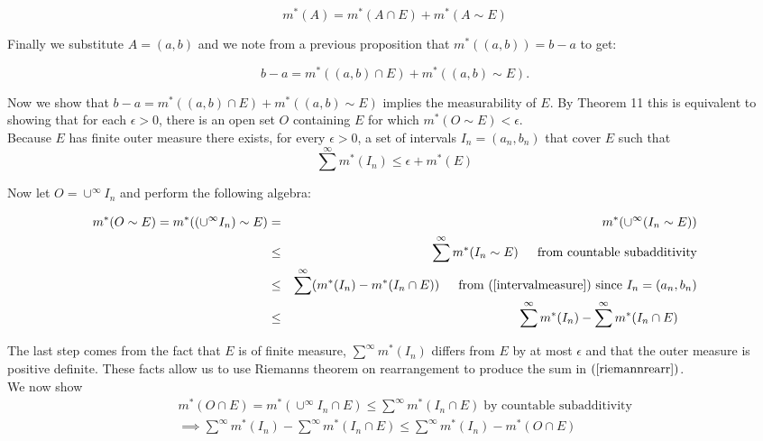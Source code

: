 \documentclass[11pt,reqno]{article}
\begin{document}
\[  m^*(A) = m^*(A \cap E) + m^*(A \sim E) \]

\noindent Finally we substitute $A = (a,b)$ and we note from a previous proposition that $m^*((a,b)) = b - a$ to get:

\begin{equation} 
b - a =  m^*((a,b) \cap E) + m^*((a,b) \sim E). \label{intervalmeasure} 
\end{equation}

Now we show that $b - a =  m^*((a,b) \cap E) + m^*((a,b) \sim E)$ implies the measurability of $E$. By Theorem 11 this is equivalent to showing that for each $\epsilon > 0$,  there is an open set $O$ containing $E$ for which $m^*(O \sim E) < \epsilon$.\\

Because $E$ has finite outer measure there exists, for every $\epsilon > 0$, a set of intervals $I_n = (a_n, b_n)$ that cover $E$ such that 
\begin{equation} 
\sum^\infty m^*(I_n)  \le \epsilon  + m^*(E) \label{finitemeasurebound} 
\end{equation}

Now let $O = \cup^\infty I_n$ and perform the following algebra:

\begin{eqnarray}
m^*(O \sim E) = m^*((\cup^\infty I_n) \sim E) &=& m^*(\cup^\infty (I_n \sim E))  \nonumber \\
&\le& \sum^\infty m^*(I_n \sim E) \hspace{15px} \text{from countable subadditivity} \nonumber \\
&\le& \sum^\infty (m^*(I_n) -  m^*(I_n \cap E)) \hspace{15px} \text{from (\ref{intervalmeasure}) since $I_n = (a_n, b_n)$} \nonumber \\
&\le& \sum^\infty m^*(I_n) -  \sum^\infty m^*(I_n \cap E) \hspace{15px} \label{riemannrearr}
\end{eqnarray}

The last step comes from the fact that $E$ is of finite measure,  $\sum^\infty m^*(I_n)$ differs from $E$ by at most $\epsilon$ and that the outer measure is positive definite. These facts allow us to use Riemanns theorem on rearrangement to produce the sum in $(\ref{riemannrearr})$.\\
We now show
\begin{eqnarray*} 
&&m^*(O \cap E) =  m^*(\cup^\infty I_n \cap E) \le \sum^\infty  m^*(I_n \cap E) \; \text{by countable subadditivity}\\
&&\implies \sum^\infty m^*(I_n) -  \sum^\infty  m^*(I_n \cap E) \le \sum^\infty m^*(I_n) - m^*(O \cap E) 
\end{eqnarray*}
\end{document}
